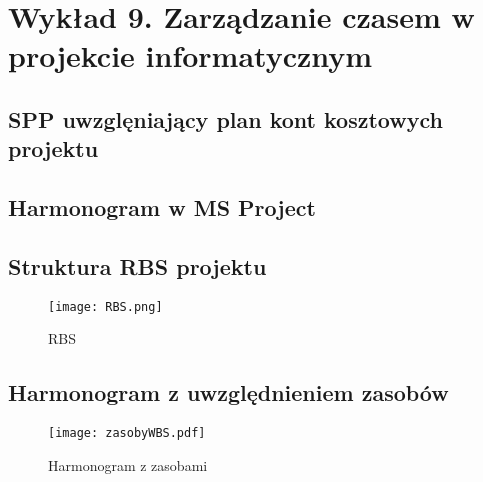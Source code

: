 \chapter{Wykład 9. Zarządzanie czasem w projekcie informatycznym}

\section{SPP uwzglęniający plan kont kosztowych projektu}




\section{Harmonogram w MS Project}




\section{Struktura RBS projektu}

\begin{figure}[htb]
\begin{center}
\texttt{[image: RBS.png]}
\caption[RBS]{RBS}
\label{rysunekProces}
\end{center}
\end{figure}


\section{Harmonogram z uwzględnieniem zasobów}

\begin{figure}[hbt]
\centering
\texttt{[image: zasobyWBS.pdf]}
\caption{Harmonogram z zasobami}
\label{fig:zasobyWBS}
\end{figure}


